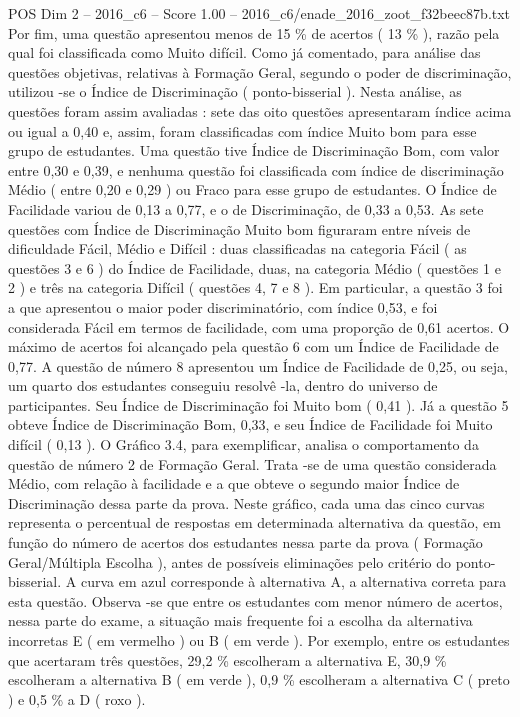 \begin{textsample}{POS Dim 2 – 2016\_c6 – Score 1.00 – 2016\_c6/enade\_2016\_zoot\_f32beec87b.txt}
Por fim, uma questão apresentou menos de 15 \% de acertos ( 13 \% ), razão pela qual foi classificada como Muito difícil.
Como já comentado, para análise das questões objetivas, relativas à Formação Geral, segundo o poder de discriminação, utilizou -se o Índice de Discriminação ( ponto-bisserial ).
Nesta análise, as questões foram assim avaliadas : sete das oito questões apresentaram índice acima ou igual a 0,40 e, assim, foram classificadas com índice Muito bom para esse grupo de estudantes.
Uma questão tive Índice de Discriminação Bom, com valor entre 0,30 e 0,39, e nenhuma questão foi classificada com índice de discriminação Médio ( entre 0,20 e 0,29 ) ou Fraco para esse grupo de estudantes.
O Índice de Facilidade variou de 0,13 a 0,77, e o de Discriminação, de 0,33 a 0,53.
As sete questões com Índice de Discriminação Muito bom figuraram entre níveis de dificuldade Fácil, Médio e Difícil : duas classificadas na categoria Fácil ( as questões 3 e 6 ) do Índice de Facilidade, duas, na categoria Médio ( questões 1 e 2 ) e três na categoria Difícil ( questões 4, 7 e 8 ).
Em particular, a questão 3 foi a que apresentou o maior poder discriminatório, com índice 0,53, e foi considerada Fácil em termos de facilidade, com uma proporção de 0,61 acertos.
O máximo de acertos foi alcançado pela questão 6 com um Índice de Facilidade de 0,77.
A questão de número 8 apresentou um Índice de Facilidade de 0,25, ou seja, um quarto dos estudantes conseguiu resolvê -la, dentro do universo de participantes.
Seu Índice de Discriminação foi Muito bom ( 0,41 ).
Já a questão 5 obteve Índice de Discriminação Bom, 0,33, e seu Índice de Facilidade foi Muito difícil ( 0,13 ).
O Gráfico 3.4, para exemplificar, analisa o comportamento da questão de número 2 de Formação Geral.
Trata -se de uma questão considerada Médio, com relação à facilidade e a que obteve o segundo maior Índice de Discriminação dessa parte da prova.
Neste gráfico, cada uma das cinco curvas representa o percentual de respostas em determinada alternativa da questão, em função do número de acertos dos estudantes nessa parte da prova ( Formação Geral/Múltipla Escolha ), antes de possíveis eliminações pelo critério do ponto-bisserial.
A curva em azul corresponde à alternativa A, a alternativa correta para esta questão.
Observa -se que entre os estudantes com menor número de acertos, nessa parte do exame, a situação mais frequente foi a escolha da alternativa incorretas E ( em vermelho ) ou B ( em verde ).
Por exemplo, entre os estudantes que acertaram três questões, 29,2 \% escolheram a alternativa E, 30,9 \% escolheram a alternativa B ( em verde ), 0,9 \% escolheram a alternativa C ( preto ) e 0,5 \% a D ( roxo ).

\end{textsample}
